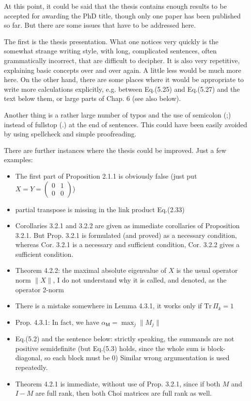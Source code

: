 \documentclass{article}
\begin{document}
At this point, it could be said that the thesis contains enough results to be accepted for
awarding the PhD title, though only one paper has been  published so far. But there are
some issues that have to be addressed here. 


The first is the thesis presentation. What one
notices very quickly is the somewhat strange writing style, with long, complicated sentences,
often grammatically incorrect, that are difficult to decipher. It is also very repetitive,
explaining basic concepts over and over again. A little less would be much more here. On
the other hand, there are some places where it would be
appropriate to write more  calculations explicitly, e.g. between Eq.(5.25) and Eq.(5.27)
and the text below them, or large parts of Chap. 6 (see also below).

Another thing is a rather large number of typos and the use of semicolon (;) instead of fullstop (.) at the end of
sentences. This could have been easily avoided by using spellcheck and simple
proofreading. 

There are further instances where the thesis could be improved.  Just a few examples:
\begin{itemize}
\item The first part of Proposition 2.1.1 is obviously false (just put $X=Y=\begin{pmatrix} 0 & 1\\ 0 &
0\end{pmatrix}$)

\item partial transpose is missing in the link product Eq.(2.33)

\item Corollaries 3.2.1 and 3.2.2 are given as immediate corollaries of Proposition
3.2.1. But Prop. 3.2.1 is formulated (and proved) as a necessary condition, whereas Cor.
3.2.1 is a necessary and sufficient condition, Cor. 3.2.2 gives a sufficient condition.

\item Theorem 4.2.2:  the maximal absolute eigenvalue of $X$ is the usual operator norm
$\|X\|$, I do not understand why it is called, and denoted, as the operator 2-norm 

\item There is a mistake somewhere in Lemma 4.3.1, it works only if $\mathrm{Tr}\,
\Pi_k=1$

\item Prop. 4.3.1: In fact, we have $\alpha_{\mathsf M}=\max_j \|M_j\|$

\item Eq.(5.2) and the sentence below: strictly speaking, the summands are not positive
semidefinite (but Eq.(5.3) holds, since the whole sum is block-diagonal, so each block
must be 0) Similar wrong argumentation is used repeatedly.

\item Theorem 4.2.1 is immediate, without use of Prop. 3.2.1, since if both $M$ and $I-M$
are full rank, then both Choi matrices are full rank as well.

\end{itemize}
\end{document}
